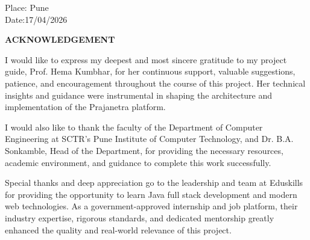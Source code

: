 \documentclass[12pt,a4paper]{report}
\begin{document}
\vspace{0.6in}

\noindent
Place: Pune\\
Date:17/04/2026

\newpage
\pagestyle{fancy}
\fancyhf{}
\renewcommand{\headrulewidth}{0pt}
\renewcommand{\footrulewidth}{0.5pt}
\fancyfoot[C]{\thepage}
\setcounter{page}{1}

\begin{center}
\vspace*{0.3in}
\textbf{\Large ACKNOWLEDGEMENT}
\end{center}

\vspace{0.4in}

\noindent
I would like to express my deepest and most sincere gratitude to my project guide, Prof. Hema Kumbhar, for her continuous support, valuable suggestions, patience, and encouragement throughout the course of this project. Her technical insights and guidance were instrumental in shaping the architecture and implementation of the Prajanetra platform.

\vspace{0.2in}

\noindent
I would also like to thank the faculty of the Department of Computer Engineering at SCTR's Pune Institute of Computer Technology, and Dr. B.A. Sonkamble, Head of the Department, for providing the necessary resources, academic environment, and guidance to complete this work successfully.

\vspace{0.2in}

\noindent
Special thanks and deep appreciation go to the leadership and team at Eduskills for providing the opportunity to learn Java full stack development and modern web technologies. As a government-approved internship and job platform, their industry expertise, rigorous standards, and dedicated mentorship greatly enhanced the quality and real-world relevance of this project.
\end{document}
